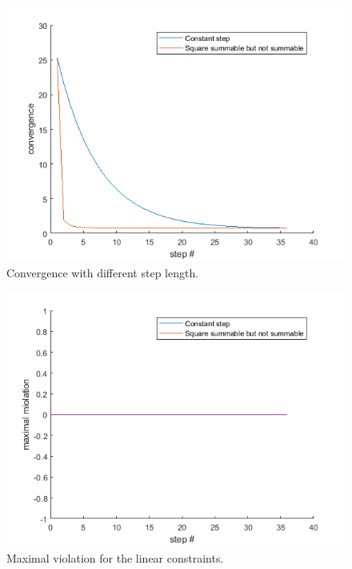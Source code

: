 \documentclass{article}
\begin{document}
\begin{figure}[H]
	\includegraphics[width=\linewidth]{fig_3_1_1.png}
	\caption{Convergence with different step length.}
	\label{fig:3_1_1}
\end{figure}

\begin{figure}[H]
	\includegraphics[width=\linewidth]{fig_3_1_2.png}
	\caption{Maximal violation for the linear constraints.}
	\label{fig:3_1_2}
\end{figure}
\end{document}
